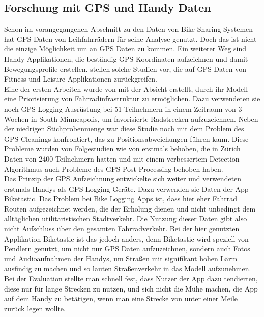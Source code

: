 \documentclass[a4paper,12pt]{thesis}
\begin{document}
\subsection{Forschung mit GPS und Handy Daten}


Schon im vorangegangenen Abschnitt zu den Daten von Bike Sharing Systemen hat \cite{Li2022} GPS Daten von Leihfahrrädern für seine Analyse genutzt. Doch das ist nicht die einzige Möglichkeit um an GPS Daten zu kommen. Ein weiterer Weg sind Handy Applikationen, die beständig GPS Koordinaten aufzeichnen und damit Bewegungsprofile erstellen. \cite{Romanillos2016} stellen solche Studien vor, die auf GPS Daten von Fitness und Leisure Applikationen zurückgreifen.\\ 
Eine der ersten Arbeiten wurde von \cite{Harvey2007} mit der Absicht erstellt, durch ihr Modell eine Priorisierung von Fahrradinfrastruktur zu ermöglichen. Dazu verwendeten sie noch GPS Logging Ausrüstung bei 51 Teilnehmern in einem Zeitraum von 3 Wochen in South Minneapolis, um favorisierte Radstrecken aufzuzeichnen. Neben der niedrigen Stichprobenmenge war diese Studie noch mit dem Problem des GPS Cleanings konfrontiert, das zu Positionsabweichungen führen kann. Diese Probleme wurden von Folgestudien wie von \cite{Menghini2010} erstmals behoben, die in Zürich Daten von 2400 Teilnehmern hatten und mit einem verbessertem Detection Algorithmus auch Probleme des GPS Post Processing behoben haben.\\ 
Das Prinzip der GPS Aufzeichnung entwickelte sich weiter und \cite{Reddy2010} verwendeten erstmals Handys als GPS Logging Geräte. Dazu verwenden sie Daten der App Biketastic. Das Problem bei Bike Logging Apps ist, dass hier eher Fahrrad Routen aufgezeichnet werden, die der Erholung dienen und nicht unbedingt dem alltäglichen utilitaristischen Stadtverkehr. Die Nutzung dieser Daten gibt also nicht Aufschluss über den gesamten Fahrradverkehr. Bei der hier genutzten Applikation Biketastic ist das jedoch anders, denn Biketastic wird speziell von Pendlern genutzt, um nicht nur GPS Daten aufzuzeichnen, sondern auch Fotos und Audioaufnahmen der Handys, um Straßen mit signifikant hohen Lärm ausfindig zu machen und so lauten Straßenverkehr in das Modell aufzunehmen. Bei der Evaluation stellte man schnell fest, dass Nutzer der App dazu tendierten, diese nur für lange Strecken zu nutzen, und sich nicht die Mühe machen, die App auf dem Handy zu betätigen, wenn man eine Strecke von unter einer Meile zurück legen wollte.\\
\end{document}
